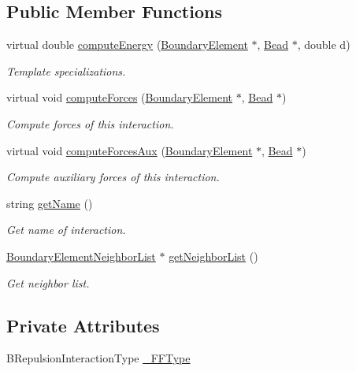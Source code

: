 \subsection*{Public Member Functions}
\begin{DoxyCompactItemize}
\item 
virtual double \hyperlink{classBoundaryRepulsion_ace56d8bd2b0287fdf1953366cdbef133}{compute\+Energy} (\hyperlink{classBoundaryElement}{Boundary\+Element} $\ast$, \hyperlink{classBead}{Bead} $\ast$, double d)
\begin{DoxyCompactList}\small\item\em Template specializations. \end{DoxyCompactList}\item 
virtual void \hyperlink{classBoundaryRepulsion_a2b7426b4039634b5837e52aa22ca2f1c}{compute\+Forces} (\hyperlink{classBoundaryElement}{Boundary\+Element} $\ast$, \hyperlink{classBead}{Bead} $\ast$)
\begin{DoxyCompactList}\small\item\em Compute forces of this interaction. \end{DoxyCompactList}\item 
virtual void \hyperlink{classBoundaryRepulsion_a7fd265f247cfd0b15b8112654ab44b89}{compute\+Forces\+Aux} (\hyperlink{classBoundaryElement}{Boundary\+Element} $\ast$, \hyperlink{classBead}{Bead} $\ast$)
\begin{DoxyCompactList}\small\item\em Compute auxiliary forces of this interaction. \end{DoxyCompactList}\item 
string \hyperlink{classBoundaryInteractions_aece29831e11962476a9d6c016b5d4b86}{get\+Name} ()
\begin{DoxyCompactList}\small\item\em Get name of interaction. \end{DoxyCompactList}\item 
\hyperlink{classBoundaryElementNeighborList}{Boundary\+Element\+Neighbor\+List} $\ast$ \hyperlink{classBoundaryElementNLContainer_aa665161110c46e0a2af9f760c96afe19}{get\+Neighbor\+List} ()
\begin{DoxyCompactList}\small\item\em Get neighbor list. \end{DoxyCompactList}\end{DoxyCompactItemize}
\subsection*{Private Attributes}
\begin{DoxyCompactItemize}
\item 
B\+Repulsion\+Interaction\+Type \hyperlink{classBoundaryRepulsion_a155fc2c7cded4f928ebd0371276e8016}{\+\_\+\+F\+F\+Type}
\end{DoxyCompactItemize}


